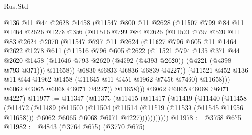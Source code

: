 \begin{lexlean}{RustStd}
\begin{coremodule}
            @136
            @11
            @44
            @2628
            @1458
            (@11547
              @800
              @11
              @2628
              (@11507
                @799
                @84
                @11
                @1464
                @2626
                @1278
                @356
                (@11516
                  @799
                  @84
                  @2626
                  (@11521
                    @797
                    @520
                    @11
                    @83
                    @2624
                    @2070
                    (@11547
                      @797
                      @11
                      @2624
                      (@11627
                        @796
                        @605
                        @11
                        @1464
                        @2622
                        @1278
                        @611
                        (@11516
                          @796
                          @605
                          @2622
                          (@11521
                            @794
                            @136
                            @371
                            @44
                            @2620
                            @1458
                            (@11646 @793 @2620 (@4392 (@4393 @2620)) (@4221 (@4398 @793 @371)))
                            @11658))
                        @6830
                        @6833
                        @6836
                        @6839
                        @4227))
                    (@11521
                      @452
                      @136
                      @11
                      @44
                      @1962
                      @1458
                      (@11645 @11 @451 @1962 @7456 @7460)
                      @11658)))
                @6062
                @6065
                @6068
                @6071
                @4227))
            @11658)))
      @6062
      @6065
      @6068
      @6071
      @4227)
@11977 := @11347
    (@11373
      (@11415
        (@11417
          (@11419
            (@11440
              (@11458
                (@11472
                  (@11489
                    (@11500
                      (@11504
                        (@11514
                          (@11519 (@11539 (@11545 @11956 @11658)))
                          @6062
                          @6065
                          @6068
                          @6071
                          @4227)))))))))))
@11978 := @3758 @675
@11982 := @4843 (@3764 @675) (@3770 @675)

\end{coremodule}
\end{lexlean}
